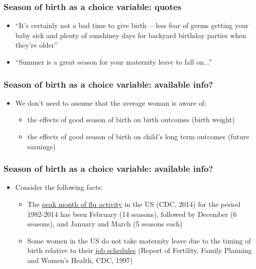 \documentclass[10pt,letterpaper,subeqn]{beamer}
\begin{document}
\begin{frame}
\frametitle{Season of birth as a choice variable: quotes}
\begin{itemize}
\item ``It's certainly not a bad time to give birth ---less fear of germs getting your baby sick and plenty of sunshiney days for backyard birthday parties when they're older''
\item ``Summer is a great season for your maternity leave to fall on...''
\end{itemize}
\end{frame}


\begin{frame}
\frametitle{Season of birth as a choice variable: available info?}
\begin{itemize}
\item We don't need to assume that the average woman is aware of:
 \begin{itemize}
\item the effects of good season of birth on birth outcomes (birth weight)
\item the effects of good season of birth on child's long term outcomes (future earnings)
  \end{itemize}
\end{itemize}
\end{frame}


\begin{frame}
\frametitle{Season of birth as a choice variable: available info?}
\begin{itemize}
\item Consider the following facts:
\begin{itemize}
\item The \underline{peak month of flu activity} in the US (CDC, 2014) for the period 1982-2014 has been February (14 seasons), followed by December (6 seasons), and January and March (5 seasons each)
\item Some women in the US do not take maternity leave due to the timing of birth relative to their \underline{job schedules} (Report of Fertility, Family Planning and Women's Health, CDC, 1997)
\end{itemize}
\end{itemize}
\end{frame}
\end{document}
